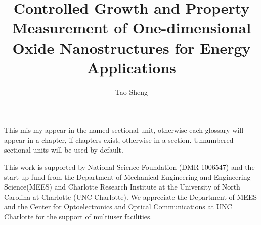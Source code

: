 
  \title{Controlled Growth and Property Measurement of One-dimensional Oxide Nanostructures for Energy Applications}
  \author{Tao Sheng}
  \thesisyear{\the\year}



\maketitle




\begin{dedication}
This mis my appear in the named sectional unit, otherwise each glossary will
appear in a chapter, if chapters exist, otherwise in a section. Unnumbered
sectional units will be used by default.
\end{dedication}


\begin{ackn}
This work is supported by National Science Foundation (DMR-1006547) and the start-up fund from the Department of Mechanical Engineering and Engineering Science(MEES) and Charlotte Research Institute at the University of North Carolina at Charlotte (UNC Charlotte). We appreciate the Department of MEES and the Center for Optoelectronics and Optical Communications at UNC Charlotte for the support of multiuser facilities.
\end{ackn}
\setcounter{tocdepth}{1}

\clearpage
\tableofcontents
\clearpage
\listoftables
\clearpage
\listoffigures
\begin{singlespace}
\renewcommand{\glossarypreamble}{\thispagestyle{myheadings}}
\renewcommand{\acronymname}{LIST OF ABBREVIATIONS}
\printglossary[type=\acronymtype]
\clearpage
\end{singlespace}


\pagebreak{} 